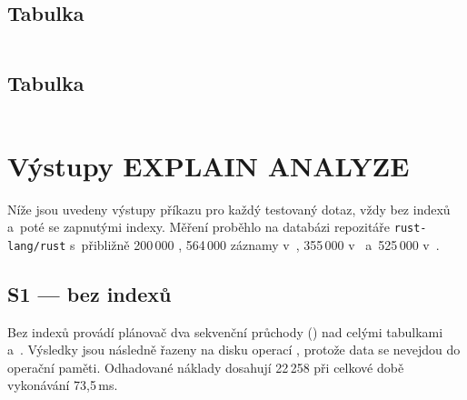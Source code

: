 \subsection*{Tabulka }
\begin{longlisting}
  \caption[Indexy tabulky contributors]{Indexy tabulky }
  \label{lst:appendix:sql:idx_contributors}
  \inputminted{sql}{./code/sql/contributors_indexes.sql}
\end{longlisting}

\subsection*{Tabulka }
\begin{longlisting}
  \caption[Indexy tabulky contributors\_teams]{Indexy tabulky }
  \label{lst:appendix:sql:idx_contributors_teams}
  \inputminted{sql}{./code/sql/contributors_teams_indexes.sql}
\end{longlisting}

\section{Výstupy EXPLAIN ANALYZE}
\label{sec:appendix:sql:explain}

Níže jsou uvedeny výstupy příkazu  pro každý testovaný dotaz, vždy bez indexů a~poté se zapnutými indexy. Měření proběhlo na databázi repozitáře \texttt{rust-lang/rust} s~přibližně 200\,000 \PR, 564\,000 záznamy v~, 355\,000 v~ a~525\,000 v~.

\subsection*{S1 --- bez indexů}

Bez indexů provádí plánovač dva sekvenční průchody () nad celými tabulkami \\  a~. Výsledky jsou následně řazeny na disku operací , protože data se nevejdou do operační paměti. Odhadované náklady dosahují 22\,258 při celkové době vykonávání 73,5\,ms.

